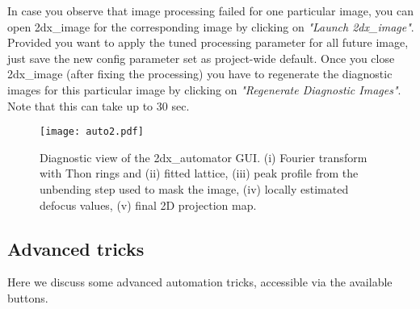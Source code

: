 In case you observe that image processing failed for one particular image, you can open 2dx\_image for the corresponding image by clicking on \textit{"Launch 2dx\_image"}. Provided you want to apply the tuned processing parameter for all future image, just save the new config parameter set as project-wide default. Once you close 2dx\_image (after fixing the processing) you have to regenerate the diagnostic images for this particular image by clicking on \textit{"Regenerate Diagnostic Images"}. Note that this can take up to 30 sec. 


\begin{figure}
	\centering
	\texttt{[image: auto2.pdf]}
	\caption{Diagnostic view of the 2dx\_automator GUI. (i) Fourier transform with Thon rings and (ii) fitted lattice, (iii) peak profile from the unbending step used to mask the image, (iv) locally estimated defocus values, (v) final 2D projection map.}
	\label{fig:auto2}
\end{figure}


\subsection{Advanced tricks}
\label{sec:auto_tricks}

Here we discuss some advanced automation tricks, accessible via the available buttons.

